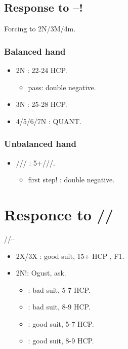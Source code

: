 \documentclass[12pt,twoside,a5paper]{report}%
\begin{document}
	\section*{Response to --!}
	Forcing to 2N/3M/4m.
		\subsection*{Balanced hand}
			\begin{itemize}
			\renewcommand{\labelitemi}{}
				\item 2N : 22-24 HCP.
				\begin{itemize}
				\renewcommand{\labelitemi}{--}
					\item pass: double negative.
				\end{itemize}
				\item 3N : 25-28 HCP.
				\item 4/5/6/7N : QUANT.
			\end{itemize}

		\subsection*{Unbalanced hand}
			\begin{itemize}
			\renewcommand{\labelitemi}{}
				\item {}/// : 5+\he{}/\sp{}/\cl{}/\di{}.
				\begin{itemize}
				\renewcommand{\labelitemi}{--}
					\item first step! : double negative.
				\end{itemize}
			\end{itemize}
\chapter*{Responce to /\he{}/\sp{}}
	//-- \\
	\begin{itemize}
	\renewcommand{\labelitemi}{}	
	\item 2X/3X : good suit, 15+ HCP , F1.
	\item 2N!: Ogust, ask.
		\begin{itemize}
		\renewcommand{\labelitemi}{--}
			\item {} : bad suit, 5-7 HCP.
			\item {} : bad suit, 8-9 HCP.
			\item {} : good suit, 5-7 HCP.
			\item {} : good suit, 8-9 HCP.
		\end{itemize}
	\end{itemize}
\end{document}
